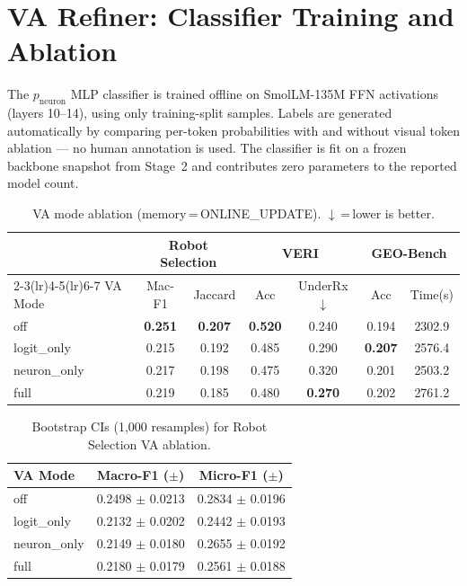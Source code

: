 \documentclass[runningheads]{llncs}
\begin{document}
\section{VA Refiner: Classifier Training and Ablation}
\label{sec:supp-va}

The $p_{\text{neuron}}$ MLP classifier is trained offline on SmolLM-135M FFN activations (layers 10--14), using only training-split samples. Labels are generated automatically by comparing per-token probabilities with and without visual token ablation — no human annotation is used. The classifier is fit on a frozen backbone snapshot from Stage~2 and contributes zero parameters to the reported model count.

\begin{table}[ht]
\centering
\caption{VA mode ablation (memory\,=\,ONLINE\_UPDATE). $\downarrow$\,=\,lower is better.}
\label{tab:va-ablation}
\setlength{\tabcolsep}{4pt}
\begin{tabular}{lcccccc}
\toprule
 & \multicolumn{2}{c}{\textbf{Robot Selection}} & \multicolumn{2}{c}{\textbf{VERI}} & \multicolumn{2}{c}{\textbf{GEO-Bench}} \\
\cmidrule(lr){2-3}\cmidrule(lr){4-5}\cmidrule(lr){6-7}
VA Mode & Mac-F1 & Jaccard & Acc & UnderRx$\downarrow$ & Acc & Time(s) \\
\midrule
off          & \textbf{0.251} & \textbf{0.207} & \textbf{0.520} & 0.240 & 0.194 & 2302.9 \\
logit\_only  & 0.215 & 0.192 & 0.485 & 0.290 & \textbf{0.207} & 2576.4 \\
neuron\_only & 0.217 & 0.198 & 0.475 & 0.320 & 0.201 & 2503.2 \\
full         & 0.219 & 0.185 & 0.480 & \textbf{0.270} & 0.202 & 2761.2 \\
\bottomrule
\end{tabular}
\end{table}

\begin{table}[ht]
\centering
\caption{Bootstrap CIs (1,000 resamples) for Robot Selection VA ablation.}
\label{tab:va-ci}
\begin{tabular}{lcc}
\toprule
VA Mode & Macro-F1 ($\pm$) & Micro-F1 ($\pm$) \\
\midrule
off          & 0.2498 $\pm$ 0.0213 & 0.2834 $\pm$ 0.0196 \\
logit\_only  & 0.2132 $\pm$ 0.0202 & 0.2442 $\pm$ 0.0193 \\
neuron\_only & 0.2149 $\pm$ 0.0180 & 0.2655 $\pm$ 0.0192 \\
full         & 0.2180 $\pm$ 0.0179 & 0.2561 $\pm$ 0.0188 \\
\bottomrule
\end{tabular}
\end{table}
\end{document}

